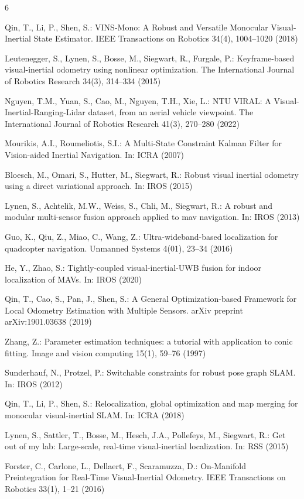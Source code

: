\documentclass{svproc}
\begin{document}
%
%
\begin{thebibliography}{6}

Qin, T., Li, P., Shen, S.: VINS-Mono: A Robust and Versatile Monocular Visual-Inertial State Estimator. IEEE Transactions on Robotics 34(4), 1004--1020 (2018)

Leutenegger, S., Lynen, S., Bosse, M., Siegwart, R., Furgale, P.: Keyframe-based visual-inertial odometry using nonlinear optimization. The International Journal of Robotics Research 34(3), 314--334 (2015)

Nguyen, T.M., Yuan, S., Cao, M., Nguyen, T.H., Xie, L.: NTU VIRAL: A Visual-Inertial-Ranging-Lidar dataset, from an aerial vehicle viewpoint. The International Journal of Robotics Research 41(3), 270--280 (2022)

Mourikis, A.I., Roumeliotis, S.I.: A Multi-State Constraint Kalman Filter for Vision-aided Inertial Navigation. In: ICRA (2007)

Bloesch, M., Omari, S., Hutter, M., Siegwart, R.: Robust visual inertial odometry using a direct variational approach. In: IROS (2015)

Lynen, S., Achtelik, M.W., Weiss, S., Chli, M., Siegwart, R.: A robust and modular multi-sensor fusion approach applied to mav navigation. In: IROS (2013)

Guo, K., Qiu, Z., Miao, C., Wang, Z.: Ultra-wideband-based localization for quadcopter navigation. Unmanned Systems 4(01), 23--34 (2016)

He, Y., Zhao, S.: Tightly-coupled visual-inertial-UWB fusion for indoor localization of MAVs. In: IROS (2020)

Qin, T., Cao, S., Pan, J., Shen, S.: A General Optimization-based Framework for Local Odometry Estimation with Multiple Sensors. arXiv preprint arXiv:1901.03638 (2019)

Zhang, Z.: Parameter estimation techniques: a tutorial with application to conic fitting. Image and vision computing 15(1), 59--76 (1997)

Sunderhauf, N., Protzel, P.: Switchable constraints for robust pose graph SLAM. In: IROS (2012)

Qin, T., Li, P., Shen, S.: Relocalization, global optimization and map merging for monocular visual-inertial SLAM. In: ICRA (2018)

Lynen, S., Sattler, T., Bosse, M., Hesch, J.A., Pollefeys, M., Siegwart, R.: Get out of my lab: Large-scale, real-time visual-inertial localization. In: RSS (2015)

Forster, C., Carlone, L., Dellaert, F., Scaramuzza, D.: On-Manifold Preintegration for Real-Time Visual-Inertial Odometry. IEEE Transactions on Robotics 33(1), 1--21 (2016)

\end{thebibliography}
\end{document}
